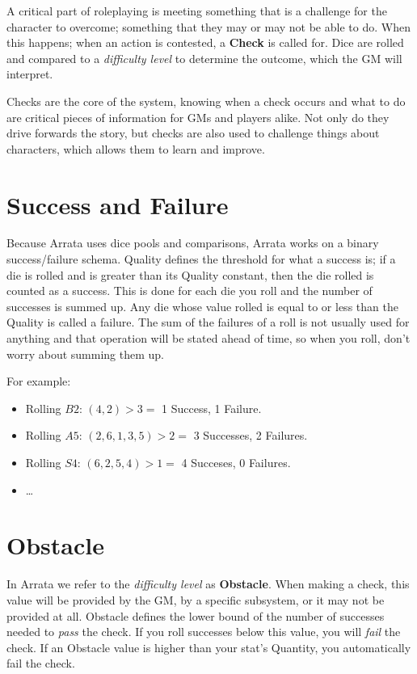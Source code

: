 \documentclass[../main.tex]{subfiles}
\begin{document}
    A critical part of roleplaying is meeting something that is a challenge for the character to overcome; something that they may or may not be able to do. When this happens; when an action is contested, a \textbf{Check} is called for. Dice are rolled and compared to a {\em difficulty level} to determine the outcome, which the GM will interpret.

    Checks are the core of the system, knowing when a check occurs and what to do are critical pieces of information for GMs and players alike. Not only do they drive forwards the story, but checks are also used to challenge things about characters, which allows them to learn and improve.

    \section{Success and Failure}

    Because Arrata uses dice pools and comparisons, Arrata works on a binary success/failure schema. Quality defines the threshold for what a success is; if a die is rolled and is greater than its Quality constant, then the die rolled is counted as a success. This is done for each die you roll and the number of successes is summed up. Any die whose value rolled is equal to or less than the Quality is called a failure. The sum of the failures of a roll is not usually used for anything and that operation will be stated ahead of time, so when you roll, don't worry about summing them up.

    For example:

    \begin{itemize}
        \item Rolling $B2$: $(4, 2)>3 =$ 1 Success, 1 Failure.
        \item Rolling $A5$: $(2, 6, 1, 3, 5)>2 =$ 3 Successes, 2 Failures.
        \item Rolling $S4$: $(6, 2, 5, 4)>1 =$ 4 Succeses, 0 Failures.
        \item \dots
    \end{itemize}

    \section{Obstacle}

    In Arrata we refer to the {\em difficulty level} as \textbf{Obstacle}. When making a check, this value will be provided by the GM, by a specific subsystem, or it may not be provided at all. Obstacle defines the lower bound of the number of successes needed to {\em pass} the check. If you roll successes below this value, you will {\em fail} the check. If an Obstacle value is higher than your stat's Quantity, you automatically fail the check.
\end{document}
